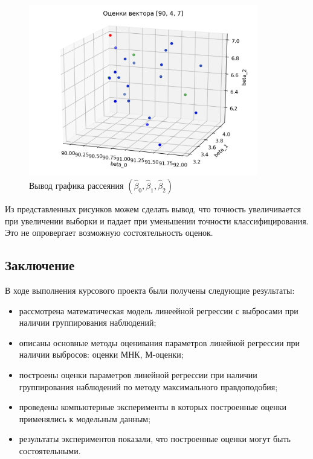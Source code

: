 \documentclass[a4paper,14pt]{extarticle}
\begin{document}
\begin{figure}[h]
    \centering
    \includegraphics[width=100mm]{pics/plot_90_4_7_(2).png}
    \caption{Вывод графика рассеяния $(\hat{\beta}_0,\hat{\beta}_1, \hat{\beta}_2)$\label{overflow}}
\end{figure}

Из представленных рисунков можем сделать вывод, что точность увеличивается при увеличении выборки и падает при уменьшении
точности классифицирования. Это не опровергает возможную состоятельность оценок.\hfill\break
\newpage

\begin{center}
    \section*{Заключение}
\end{center}
{}
В ходе выполнения курсового проекта были получены следующие результаты:
\begin{itemize}
    \item рассмотрена математическая модель линеейной регрессии с выбросами при наличии группирования наблюдений;
    \item описаны основные методы оценивания параметров линейной регрессии при наличии выбросов: оценки МНК, М-оценки;
    \item построены оценки параметров линейной регрессии при наличии группирования наблюдений по методу максимального правдоподобия;
    \item проведены компьютерные эксперименты в которых построенные оценки применялись к модельным данным;
    \item результаты экспериментов показали, что построенные оценки могут быть состоятельными.
\end{itemize}
\end{document}
